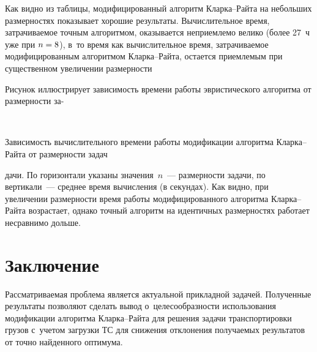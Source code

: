 \begin{multicols}{2}
  Как видно из таблицы, модифицированный алгоритм Клар\-ка--Рай\-та на
небольших размерностях показывает хорошие результаты. Вычислительное
время, затрачиваемое точным алгоритмом, оказывается неприемлемо велико
(более 27~ч уже при $n\hm=8$), в~то время как вычислительное время,
затрачиваемое модифицированным алгоритмом Клар\-ка--Рай\-та, остается
приемлемым при существенном увеличении размерности

  Рисунок иллюстрирует зависимость времени работы эвристического
алгоритма от размерности за-\linebreak\vspace*{-12pt}
 \begin{center}
 \mbox{%
 \epsfxsize=77.428mm
 }
 \end{center}

\noindent
{\small Зависимость вычислительного времени работы модификации алгоритма
Клар\-ка--Рай\-та от размерности задач}

\vspace*{9pt}


\noindent
дачи. По горизонтали указаны значения~$n$~---
размерности задачи, по вертикали~--- среднее время вычисления (в секундах).
Как видно, при увеличении размерности время работы модифицированного
алгоритма Клар\-ка--Рай\-та возрастает, однако точный алгоритм на
идентичных размерностях работает несравнимо дольше.



\section{Заключение}

  Рассматриваемая проблема является актуальной прикладной задачей.
Полученные результаты позволяют сделать вывод о~целесообразности
использования модификации алгоритма Клар\-ка--Рай\-та для решения задачи
транспортировки грузов с~учетом загрузки ТС для
снижения отклонения получаемых результатов от точно найденного оптимума.


\end{multicols}
